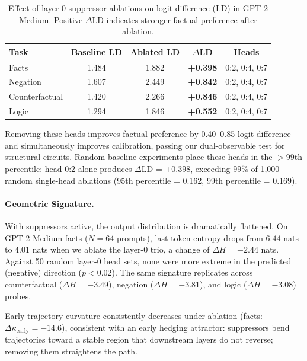 \begin{table}[h]
    \centering
    \caption{Effect of layer-0 suppressor ablations on logit difference (LD) in GPT-2 Medium. Positive $\Delta$LD indicates stronger factual preference after ablation.}
    \label{tab:exp1-impact}
    \begin{tabular}{lcccc}
        \toprule
        Task & Baseline LD & Ablated LD & $\Delta$LD & Heads \\
        \midrule
        Facts          & 1.484 & 1.882 & \textbf{+0.398} & 0:2, 0:4, 0:7 \\
        Negation       & 1.607 & 2.449 & \textbf{+0.842} & 0:2, 0:4, 0:7 \\
        Counterfactual & 1.420 & 2.266 & \textbf{+0.846} & 0:2, 0:4, 0:7 \\
        Logic          & 1.294 & 1.846 & \textbf{+0.552} & 0:2, 0:4, 0:7 \\
        \bottomrule
    \end{tabular}
\end{table}

Removing these heads improves factual preference by 0.40--0.85 logit difference and simultaneously improves calibration, passing our dual-observable test for structural circuits. Random baseline experiments place these heads in the $>99$th percentile: head 0:2 alone produces $\Delta$LD = +0.398, exceeding 99\% of 1,000 random single-head ablations (95th percentile = 0.162, 99th percentile = 0.169).

\paragraph{Geometric Signature.}
With suppressors active, the output distribution is dramatically flattened. On GPT-2 Medium facts ($N=64$ prompts), last-token entropy drops from $6.44$ nats to $4.01$ nats when we ablate the layer-0 trio, a change of $\Delta H = -2.44$ nats. Against 50 random layer-0 head sets, none were more extreme in the predicted (negative) direction ($p < 0.02$). The same signature replicates across counterfactual ($\Delta H = -3.49$), negation ($\Delta H = -3.81$), and logic ($\Delta H = -3.08$) probes.

Early trajectory curvature consistently decreases under ablation (facts: $\Delta \kappa_{\text{early}} = -14.6$), consistent with an early hedging attractor: suppressors bend trajectories toward a stable region that downstream layers do not reverse; removing them straightens the path.

